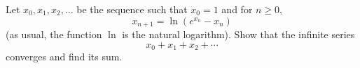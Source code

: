 Let $x_0,x_1,x_2,\dots$ be the sequence such that $x_0=1$ and for $n\ge 0,$
\[x_{n+1}=\ln(e^{x_n}-x_n)\](as usual, the function $\ln$ is the natural logarithm). Show that the infinite series
\[x_0+x_1+x_2+\cdots\]converges and find its sum.
